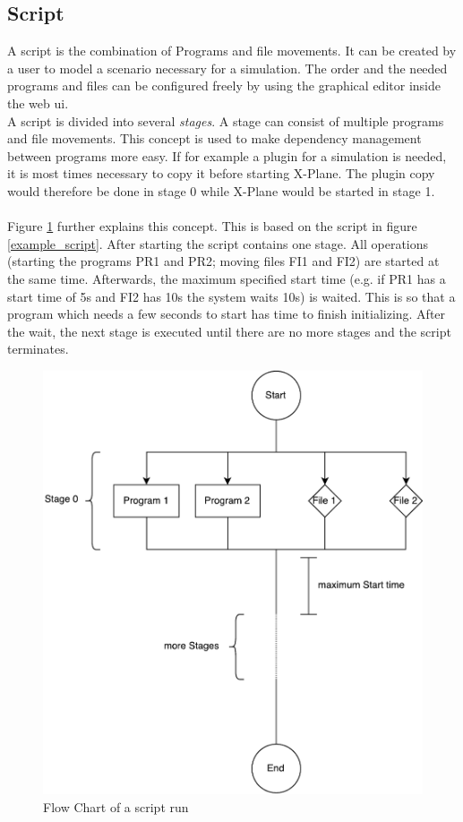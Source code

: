 \documentclass[accentcolor=tud1a, paper=a4, colorback]{tudreport}
\newcommand{\ind}[1]{#1\index{#1}}
\begin{document}
	\subsection{\ind{Script}}\label{script}
	A script is the combination of Programs and file movements. It can be created by a user to model
	a scenario necessary for a simulation. The order and the needed programs and files can be configured
	freely by using the graphical editor inside the web ui.
	\\
	A script is divided into several \textit{\ind{stages}}. A stage can consist of multiple programs
	and file movements. This concept is used to make dependency management between programs more easy.
	If for example a plugin for a simulation is needed, it is most times necessary to copy it before starting
	X-Plane. The plugin copy would therefore be done in stage 0 while X-Plane would be started in stage 1.
	\\\\
	Figure \ref{schedule} further explains this concept. This is based on the script in figure \ref{example_script}.
	After starting the script contains one stage. All operations (starting the programs PR1 and PR2; moving files FI1 and FI2)
	are started at the same time. Afterwards, the maximum specified start time (e.g. if PR1 has a start time of 5s and FI2 has
	10s the system waits 10s) is waited. This is so that a program which
	needs a few seconds to start has time to finish initializing. After the wait, the next stage is executed until
	there are no more stages and the script terminates.

	\begin{figure}[H]
		\centering
		\includegraphics[width=.7\textwidth]{schedule}
		\caption{Flow Chart of a script run}
		\label{schedule}
	\end{figure}
\end{document}
